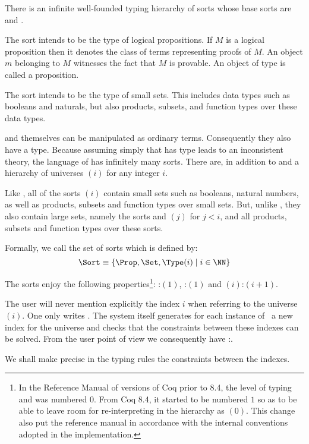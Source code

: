 There is an infinite well-founded typing hierarchy of sorts whose base
sorts are {\Prop} and {\Set}.

The sort {\Prop} intends to be the type of logical propositions. If
$M$ is a logical proposition then it denotes the class of terms
representing proofs of $M$. An object $m$ belonging to $M$ witnesses
the fact that $M$ is provable. An object of type {\Prop} is called a
proposition.

The sort {\Set} intends to be the type of small sets. This includes data
types such as booleans and naturals, but also products, subsets, and
function types over these data types.

{\Prop} and {\Set} themselves can be manipulated as ordinary
terms. Consequently they also have a type. Because assuming simply
that {\Set} has type {\Set} leads to an inconsistent theory, the
language of {\CIC} has infinitely many sorts. There are, in addition
to {\Set} and {\Prop} a hierarchy of universes {\Type$(i)$} for any
integer $i$.

Like {\Set}, all of the sorts {\Type$(i)$} contain small sets such as
booleans, natural numbers, as well as products, subsets and function
types over small sets. But, unlike {\Set}, they also contain large
sets, namely the sorts {\Set} and {\Type$(j)$} for $j<i$, and all
products, subsets and function types over these sorts.

Formally, we call {\Sort} the set of sorts which is defined by:
\[\Sort \equiv \{\Prop,\Set,\Type(i)\;|\; i \in \NN\} \]

The sorts enjoy the following properties\footnote{In the Reference
  Manual of versions of Coq prior to 8.4, the level of {\Type} typing
  {\Prop} and {\Set} was numbered $0$. From Coq 8.4, it started to be
  numbered $1$ so as to be able to leave room for re-interpreting
  {\Set} in the hierarchy as {\Type$(0)$}. This change also put the
  reference manual in accordance with the internal conventions adopted
  in the implementation.}: {\Prop:\Type$(1)$}, {\Set:\Type$(1)$} and
{\Type$(i)$:\Type$(i+1)$}.

The user will never mention explicitly the index $i$ when referring to
the universe \Type$(i)$. One only writes \Type. The
system itself generates for each instance of \Type\ a new
index for the universe and checks that the constraints between these
indexes can be solved. From the user point of view we consequently
have {\Type}:{\Type}.

We shall make precise in the typing rules the constraints between the
indexes. 


